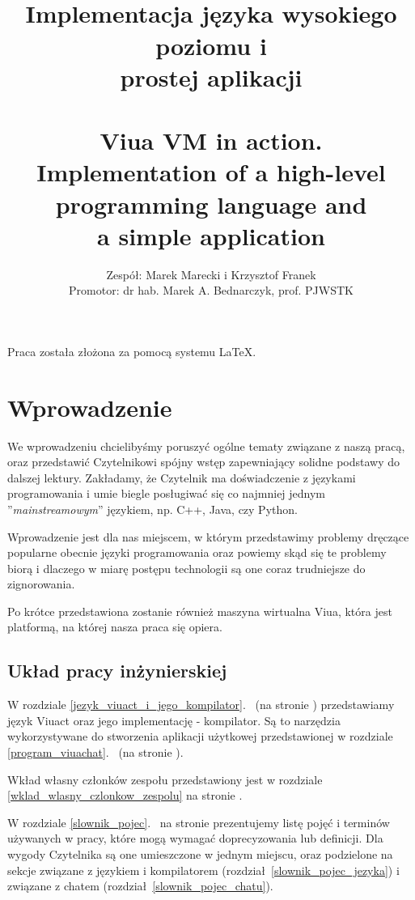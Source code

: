\documentclass[11pt,oneside,a4paper,titlepage,onecolumn]{book}
\author{Zespół: Marek Marecki i Krzysztof Franek\\Promotor: dr hab. Marek A. Bednarczyk, prof. PJWSTK}
\title{%
    \inzmaintitlePL \\
    \large
    Implementacja języka wysokiego poziomu i \\
    prostej aplikacji\\
    ~\\
    Viua VM in action.\\
    Implementation of a high-level programming language and\\ a simple application}
\begin{document}

\maketitle

\tableofcontents
\listoffigures

Praca została złożona za pomocą systemu \LaTeX.

\newpage

\chapter{Wprowadzenie}

We wprowadzeniu chcielibyśmy poruszyć ogólne tematy związane z naszą pracą, oraz przedstawić Czytelnikowi
spójny wstęp zapewniający solidne podstawy do dalszej lektury. Zakładamy, że Czytelnik ma doświadczenie z
językami programowania i umie biegle posługiwać się co najmniej jednym ''\emph{mainstreamowym}'' językiem, np.
C++, Java, czy Python.

Wprowadzenie jest dla nas miejscem, w którym przedstawimy problemy dręczące popularne obecnie języki
programowania oraz powiemy skąd się te problemy biorą i dlaczego w miarę postępu technologii są one coraz
trudniejsze do zignorowania.

Po krótce przedstawiona zostanie również maszyna wirtualna Viua, która jest platformą, na której nasza praca
się opiera.

\section{Układ pracy inżynierskiej}

W rozdziale \ref{jezyk_viuact_i_jego_kompilator}.~ (na stronie
\pageref{jezyk_viuact_i_jego_kompilator}) przedstawiamy język Viuact oraz jego implementację - kompilator.
Są to narzędzia wykorzystywane do stworzenia aplikacji użytkowej przedstawionej w rozdziale
\ref{program_viuachat}.~ (na stronie \pageref{program_viuachat}).

Wkład własny członków zespołu przedstawiony jest w rozdziale \ref{wklad_wlasny_czlonkow_zespolu} na stronie
\pageref{wklad_wlasny_czlonkow_zespolu}.

W rozdziale \ref{slownik_pojec}.~ na stronie \pageref{slownik_pojec} prezentujemy listę
pojęć i terminów używanych w pracy, które mogą wymagać doprecyzowania lub definicji. Dla wygody Czytelnika są
one umieszczone w jednym miejscu, oraz podzielone na sekcje związane z językiem i kompilatorem
(rozdział~\ref{slownik_pojec_jezyka}) i związane z chatem (rozdział~\ref{slownik_pojec_chatu}).
\end{document}
